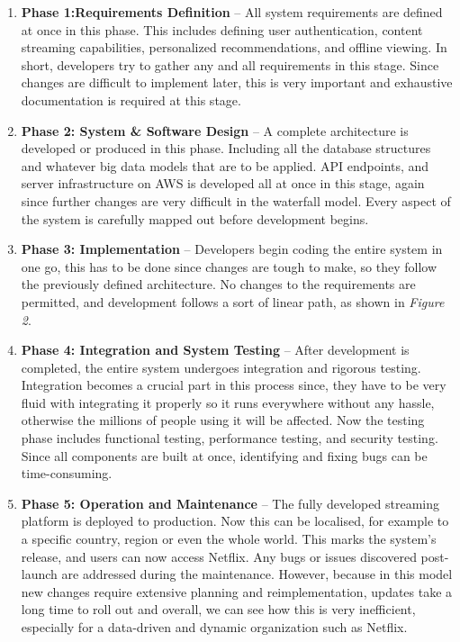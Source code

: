 \documentclass[a4paper,10pt,twoside]{article}
\begin{document}
\begin{enumerate}
    \item \textbf{Phase 1:Requirements Definition} – All system requirements are defined at once in this phase. This includes defining user authentication, content streaming capabilities, personalized recommendations, and offline viewing. In short, developers try to gather any and all requirements in this stage. Since changes are difficult to implement later, this is very important and exhaustive documentation is required at this stage.
    \item \textbf{Phase 2: System \& Software Design} – A complete architecture is developed or produced in this phase. Including all the database structures and whatever big data models that are to be applied. API endpoints, and server infrastructure on AWS is developed all at once in this stage, again since further changes are very difficult in the waterfall model. Every aspect of the system is carefully mapped out before development begins.
    \item \textbf{Phase 3: Implementation} – Developers begin coding the entire system in one go, this has to be done since changes are tough to make, so they follow the previously defined architecture. No changes to the requirements are permitted, and development follows a sort of linear path, as shown in \emph{Figure 2}.
    \item \textbf{Phase 4: Integration and System Testing} – After development is completed, the entire system undergoes integration and rigorous testing. Integration becomes a crucial part in this process since, they have to be very fluid with integrating it properly so it runs everywhere without any hassle, otherwise the millions of people using it will be affected. Now the testing phase includes functional testing, performance testing, and security testing. Since all components are built at once, identifying and fixing bugs can be time-consuming.
    \item \textbf{Phase 5: Operation and Maintenance} – The fully developed streaming platform is deployed to production. Now this can be localised, for example to a specific country, region or even the whole world. This marks the system’s release, and users can now access Netflix. Any bugs or issues discovered post-launch are addressed during the maintenance. However, because in this model new changes require extensive planning and reimplementation, updates take a long time to roll out and overall, we can see how this is very inefficient, especially for a data-driven and dynamic organization such as Netflix.
\end{enumerate}
\end{document}

